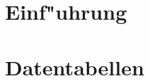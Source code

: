 \documentclass[a4paper,parskip,11pt, DIV12]{scrreprt}
\begin{document}
\fancyfoot{}
\fancyfoot[R]{\small \thepage}
\fancyfoot[L]{}
\fancyfoot[C]{}
\renewcommand{\footrulewidth}{0.4pt} 

\addtolength{\headheight}{2\baselineskip}
\addtolength{\headheight}{0.6pt}


\renewcommand{\headrulewidth}{0.6pt}
\renewcommand{\footrulewidth}{0.4pt}

\renewcommand{\chaptermark}[1]{ \markboth{#1}{} } %



\chapter{Einf"uhrung}


\clearpage

\chapter{Datentabellen}
\end{document}
